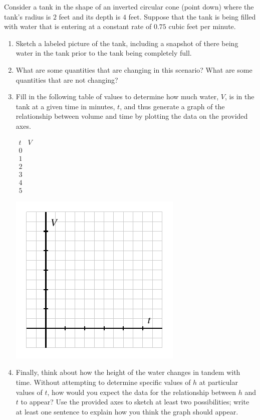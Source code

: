 \documentclass{ximera}
\begin{document}
\begin{exploration}
Consider a tank in the shape of an inverted circular cone (point down) where the tank's radius is \(2\) feet and its depth is \(4\) feet.  Suppose that the tank is being filled with water that is entering at a constant rate of \(0.75\) cubic feet per minute.%
\begin{enumerate}[label=\alph*.]
\item Sketch a labeled picture of the tank, including a snapshot of there being water in the tank prior to the tank being completely full.%
\item What are some quantities that are changing in this scenario?  What are some quantities that are not changing?%
\item Fill in the following table of values to determine how much water, \(V\), is in the tank at a given time in minutes, \(t\), and thus generate a graph of the relationship between volume and time by plotting the data on the provided axes.%

\begin{center}
\(
\begin{array}{cc}
t&V\\
\hline
0&\\
1&\\
2&\\
3&\\
4&\\
5&
\end{array}
\)
\end{center}


\begin{image}
\includegraphics{tandem-V-t-blank-axes}
\end{image}

\item Finally, think about how the height of the water changes in tandem with time.  Without attempting to determine specific values of \(h\) at particular values of \(t\), how would you expect the data for the relationship between \(h\) and \(t\) to appear?  Use the provided axes to sketch at least two possibilities; write at least one sentence to explain how you think the graph should appear.%



\end{enumerate}
\end{exploration}
\end{document}
